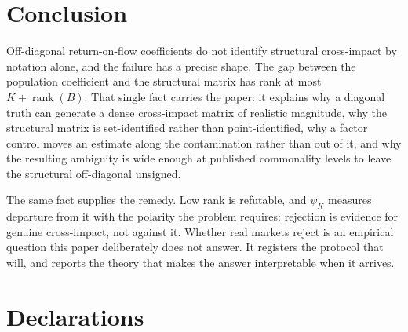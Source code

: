 \documentclass[10pt,twocolumn]{article}
\theoremstyle{remark}
\newcommand{\rank}{\operatorname{rank}}
\begin{document}
\section{Conclusion}

Off-diagonal return-on-flow coefficients do not identify structural
cross-impact by notation alone, and the failure has a precise shape. The gap
between the population coefficient and the structural matrix has rank at most
$K+\rank(B)$. That single fact carries the paper: it explains why a diagonal
truth can generate a dense cross-impact matrix of realistic magnitude, why the
structural matrix is set-identified rather than point-identified, why a factor
control moves an estimate along the contamination rather than out of it, and
why the resulting ambiguity is wide enough at published commonality levels to
leave the structural off-diagonal unsigned.

The same fact supplies the remedy. Low rank is refutable, and $\psi_K$
measures departure from it with the polarity the problem requires: rejection is
evidence for genuine cross-impact, not against it. Whether real markets reject
is an empirical question this paper deliberately does not answer. It registers
the protocol that will, and reports the theory that makes the answer
interpretable when it arrives.

\section*{Declarations}
\end{document}
